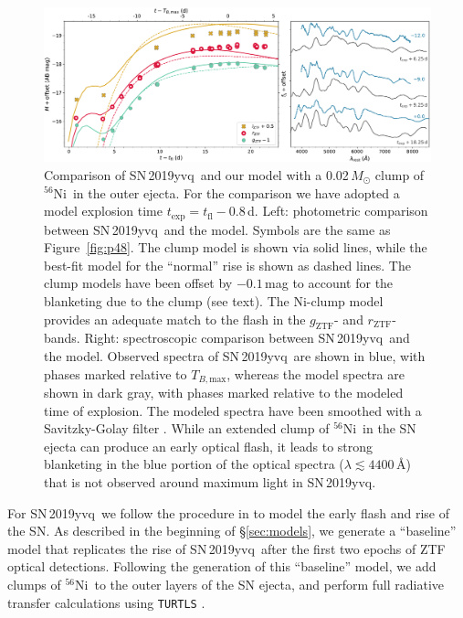 \documentclass[twocolumn]{aastex63}
\newcommand{\rztf}{$r_\mathrm{ZTF}$}
\newcommand{\gztf}{$g_\mathrm{ZTF}$}
\newcommand{\tbmax}{$T_{B,\mathrm{max}}$}
\newcommand{\radni}{$^{56}$Ni}
\newcommand{\sn}{SN\,2019yvq}
\begin{document}
\begin{figure}
    \centering
    \includegraphics[width=\textwidth]{./figures/clump_model.pdf}
    \caption{Comparison of \sn\ and our model with a 0.02\,$M_\odot$
    clump of \radni\ in the outer ejecta. For the comparison we have adopted a
    model explosion time $t_\mathrm{exp} = t_\mathrm{fl} - 0.8$\,d.
    Left: photometric comparison between \sn\ and the model. Symbols
    are the same as Figure~\ref{fig:p48}. The clump model is shown via solid
    lines, while the best-fit model for the ``normal'' rise is shown as dashed
    lines. The clump models have been offset by $-0.1$\,mag to account for the
    blanketing due to the clump (see text). The Ni-clump model provides an
    adequate match to the flash in the \gztf- and \rztf-bands.
    Right: spectroscopic comparison between \sn\ and the model.
    Observed spectra of \sn\ are shown in blue, with phases marked relative to
    \tbmax, whereas the model spectra are shown in dark gray, with phases
    marked relative to the modeled time of explosion. The modeled spectra have
    been smoothed with a Savitzky-Golay filter \citep{Savitzky64}. While an
    extended clump of \radni\ in the SN ejecta can produce an early optical
    flash, it leads to strong blanketing in the blue portion of the optical
    spectra ($\lambda \lesssim 4400$\,\AA) that is not observed around maximum
    light in \sn. }
    \label{fig:Ni_bullet}
\end{figure}

For \sn\ we follow the procedure in \citet{Magee20a} to model the early flash
and rise of the SN. As described in the beginning of \S\ref{sec:models}, we
generate a ``baseline'' model that replicates the rise of \sn\ after the first
two epochs of ZTF optical detections. Following the generation of this
``baseline'' model, we add clumps of \radni\ to the outer layers of the SN
ejecta, and perform full radiative transfer calculations using \texttt{TURTLS}
\citep{Magee18}. 
\end{document}
